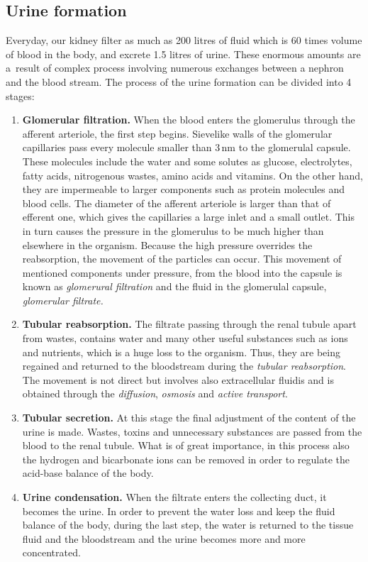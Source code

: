 \subsection{Urine formation} 
Everyday, our kidney filter as much as 200 litres of fluid which is 60 times volume of blood in the body, and excrete 1.5 litres of urine. These enormous amounts are a~result of complex process involving numerous exchanges between a nephron and the blood stream. The process of the urine formation can be divided into 4 stages:
\begin{enumerate}
\item{\textbf{Glomerular filtration.}} When the blood enters the glomerulus through the afferent arteriole, the first step begins. Sievelike walls of the glomerular capillaries  pass every molecule smaller than 3\,nm to the glomerulal capsule. These molecules include the water and some solutes as glucose, electrolytes, fatty acids, nitrogenous wastes, amino acids and vitamins. On the other hand, they are impermeable to larger components such as protein molecules and blood cells.  The diameter of the afferent arteriole is larger than that of efferent one, which gives the capillaries a large inlet and a small outlet. This in turn causes the pressure in the glomerulus to be much higher than elsewhere in the organism. Because the high pressure overrides the reabsorption, the movement of the particles can occur. This movement  of  mentioned components   under  pressure, from  the  blood  into  the  capsule is known as \textit{glomerural filtration} and the fluid in the glomerulal capsule, \textit{glomerular filtrate.} 

  
\item{\textbf{Tubular reabsorption.}} The filtrate passing through the renal tubule apart from wastes, contains water and many other useful substances such as ions and nutrients, which is a huge loss to the organism. Thus, they are being regained and returned to the bloodstream during the \textit{tubular reabsorption}. The movement is not direct but involves also extracellular fluidis and is obtained through the \textit{diffusion}, \textit{osmosis} and \textit{active transport}. 
 
\item{\textbf{Tubular secretion.}} At this stage the final adjustment of the content of the urine is made. Wastes, toxins and unnecessary substances are passed from the blood to the renal tubule. What is of great importance, in this process also the hydrogen and bicarbonate ions can be removed in order to regulate the acid-base balance of the body.

\item{\textbf{Urine condensation.}} When the filtrate enters the collecting duct, it becomes the urine. In order to prevent the water loss and keep the fluid balance of the body, during the last step, the water is returned to the tissue fluid and the bloodstream and the urine becomes more and more concentrated.

\end{enumerate}
